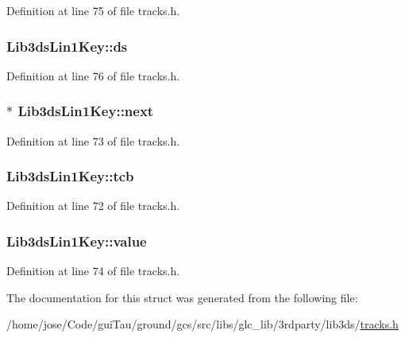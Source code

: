 Definition at line 75 of file tracks.\-h.

\hypertarget{struct_lib3ds_lin1_key_a082f7b2c95af7febffb0c08cf21338be}{
\subsubsection[{ds}]{ Lib3ds\-Lin1\-Key\-::ds}}\label{struct_lib3ds_lin1_key_a082f7b2c95af7febffb0c08cf21338be}


Definition at line 76 of file tracks.\-h.

\hypertarget{struct_lib3ds_lin1_key_a10149328e4a22a442277a53fb01a9095}{
\subsubsection[{next}]{$\ast$ Lib3ds\-Lin1\-Key\-::next}}\label{struct_lib3ds_lin1_key_a10149328e4a22a442277a53fb01a9095}


Definition at line 73 of file tracks.\-h.

\hypertarget{struct_lib3ds_lin1_key_ab1ac20f75e6af79b27af9e835f7ac4dc}{
\subsubsection[{tcb}]{ Lib3ds\-Lin1\-Key\-::tcb}}\label{struct_lib3ds_lin1_key_ab1ac20f75e6af79b27af9e835f7ac4dc}


Definition at line 72 of file tracks.\-h.

\hypertarget{struct_lib3ds_lin1_key_a834374640e73d4b8ca8fd1dafd236ae0}{
\subsubsection[{value}]{ Lib3ds\-Lin1\-Key\-::value}}\label{struct_lib3ds_lin1_key_a834374640e73d4b8ca8fd1dafd236ae0}


Definition at line 74 of file tracks.\-h.



The documentation for this struct was generated from the following file\-:\begin{DoxyCompactItemize}
\item 
/home/jose/\-Code/gui\-Tau/ground/gcs/src/libs/glc\-\_\-lib/3rdparty/lib3ds/\hyperlink{tracks_8h}{tracks.\-h}\end{DoxyCompactItemize}
